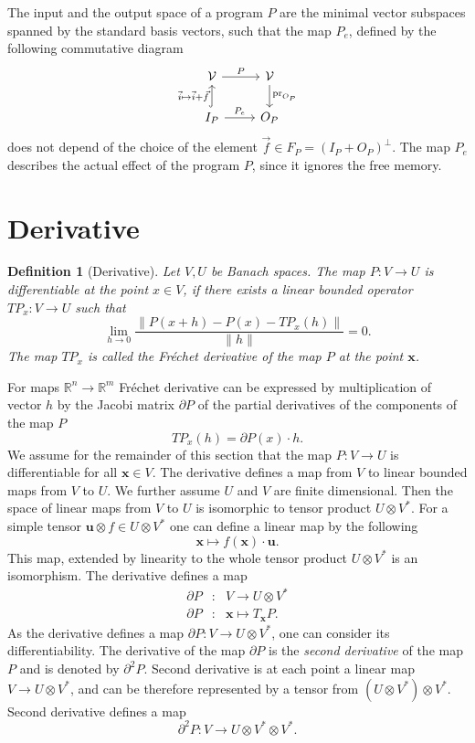 \documentclass{article}
\newcommand{\RR}{\mathbb{R}}
\newcommand{\VV}{\mathcal{V}}
\newcommand{\x}{\mathbf{x}}
\newcommand{\uu}{\mathbf{u}}
\newcommand{\D}{\partial}
\newtheorem{definicija}{Definition}[section]
\begin{document}
The input and the output space of a program $P$ are the minimal
vector subspaces spanned by the standard basis vectors, such that the map $P_e$, 
defined by the following commutative diagram 
\begin{equation} 
    \label{eq:induced_map}
\begin{tikzcd}
  \VV \arrow{r}{P} & 
  \VV \arrow{d}{\mathrm{pr}_{O_P}}\\
  I_P \arrow[hook]{u}{\vec{i}\mapsto \vec{i}+\vec{f}} 
  \arrow{r}{P_e}& O_P
\end{tikzcd}
  \end{equation}
does not depend of the choice of the element 
$\vec{f}\in F_P=(I_P+O_P)^\perp$. The map $P_e$ describes the actual effect of the
program $P$, since it ignores the free memory. 
\section{Derivative}
\begin{definicija}[Derivative]
  Let $V,U$ be Banach spaces. The map $P:V\to U$ is differentiable at the point
  $x\in V$, if there exists a linear bounded operator $TP_x:V\to U$ such that
  \begin{equation}
    \label{eq:frechet}
    \lim_{h\to 0}\frac{\|P(x+h)-P(x)-TP_x(h)\|}{\|h\|} = 0.
  \end{equation}
  The map $TP_x$ is called the \emph{Fréchet derivative} of the map $P$ at the
  point $\x$.
\end{definicija}
For maps $\RR^n\to \RR^m$ Fréchet derivative can be expressed by multiplication
of vector $h$ by the Jacobi matrix $\D P$ of the  partial derivatives of the 
components of the map $P$
\begin{equation*}
  TP_x(h) = \D P(x)\cdot h.
\end{equation*}
We assume for the remainder of this section that the map $P:V\to U$ is
differentiable for all $\x\in V$. The derivative defines a map from $V$ to
linear bounded maps from $V$ to $U$. We further assume $U$ and $V$ are finite
dimensional. Then the space of linear maps from $V$ to $U$ is isomorphic to
tensor product $U\otimes V^*$. For a simple tensor $\uu\otimes f\in U\otimes
V^*$ one can define a linear map by the following
 \begin{equation}
   \label{eq:lin_tenzor}
   \x \mapsto f(\x)\cdot \uu.
 \end{equation}
This map, extended by linearity to the whole tensor product $U\otimes V^*$ is an
isomorphism. The derivative defines a map
\begin{eqnarray}
  \label{eq:odvod_preslikava}
  \D P&:& V\to U\otimes V^*\\
  \D P&:& \x \mapsto T_\x P.
\end{eqnarray}
As the derivative defines a map $\D P:V\to U\otimes V^*$, one can consider its
differentiability. The derivative of the map $\D P$ is the \emph{second derivative}
of the map $P$ and is denoted by $\D^2P$. Second derivative is at each point a
linear map  $V\to U\otimes V^*$, and can be therefore 
represented by a tensor from $(U\otimes V^*)\otimes V^*$. Second derivative
defines a map 
$$\D^2 P:V\to U\otimes V^*\otimes V^*.$$ 
\end{document}
